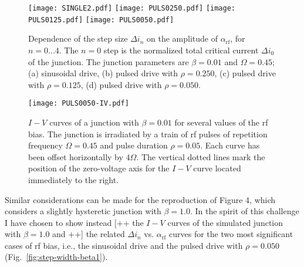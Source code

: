 \begin{figure}[tbh]
	\centering
	\texttt{[image: SINGLE2.pdf]}
	\texttt{[image: PULS0250.pdf]}
	\texttt{[image: PULS0125.pdf]}
	\texttt{[image: PULS0050.pdf]}
	\caption{Dependence of the step size $\Delta i_n$ on the amplitude of  $\alpha_\mathrm{rf}$, for $n = 0. . . 4$. The $n = 0$ step is the normalized total critical current $\Delta i_0$ of the junction. The junction parameters are $\beta = 0. 01$ and $\Omega = 0. 45$; (a) sinusoidal drive, (b) pulsed drive with $\rho = 0. 250$, (c) pulsed drive with $\rho = 0. 125$, (d) pulsed drive with $\rho = 0. 050$.}
	\label{fig:step-width}
\end{figure}

\begin{figure}[tbh]
	\centering
	\texttt{[image: PULS0050-IV.pdf]}
	\caption{$I - V$ curves of a junction with $\beta = 0.01$ for several values of the rf bias. The junction is  irradiated by a train of rf pulses of repetition frequency $\Omega = 0.45$ and pulse duration $\rho = 0.05$. Each curve has been offset horizontally by $4 \Omega$. The vertical dotted lines mark the position of the zero-voltage axis for the $I - V$ curve located immediately to the right.}
	\label{fig:pulsed-ivs}
\end{figure}


Similar considerations can be made for the reproduction of Figure 4, which considers a slightly hysteretic junction with $\beta = 1.0$. In the spirit of this challenge I have chosen to show instead [++ the $I - V$ curves of the simulated junction with $\beta = 1.0$ and ++] the related $\Delta i_n$ vs. $\alpha_\mathrm{rf}$ curves for the two most significant cases of rf bias, i.e., the sinusoidal drive and the pulsed drive with $\rho = 0.050$ (Fig.~\ref{fig:step-width-beta1}).

